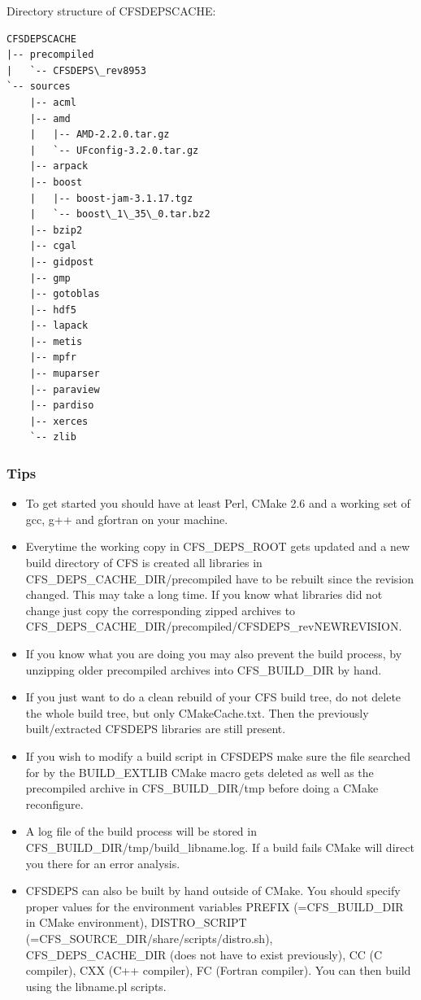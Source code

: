 Directory structure of CFSDEPSCACHE:

\begin{verbatim}
CFSDEPSCACHE
|-- precompiled
|   `-- CFSDEPS\_rev8953
`-- sources
    |-- acml
    |-- amd
    |   |-- AMD-2.2.0.tar.gz
    |   `-- UFconfig-3.2.0.tar.gz
    |-- arpack
    |-- boost
    |   |-- boost-jam-3.1.17.tgz
    |   `-- boost\_1\_35\_0.tar.bz2
    |-- bzip2
    |-- cgal
    |-- gidpost
    |-- gmp
    |-- gotoblas
    |-- hdf5
    |-- lapack
    |-- metis
    |-- mpfr
    |-- muparser
    |-- paraview
    |-- pardiso
    |-- xerces
    `-- zlib
\end{verbatim}


\subsubsection{Tips}
\begin{itemize}
\item To get  started you should have  at least Perl, CMake 2.6  and a working
set of gcc, g++ and gfortran on your machine.

\item Everytime  the working  copy in CFS\_DEPS\_ROOT  gets updated and  a new
build     directory    of     CFS    is     created    all     libraries    in
CFS\_DEPS\_CACHE\_DIR/precompiled  have  to  be  rebuilt  since  the  revision
changed. This may take a long time.  If you know what libraries did not change
just      copy       the      corresponding      zipped       archives      to
CFS\_DEPS\_CACHE\_DIR/precompiled/CFSDEPS\_revNEWREVISION.

\item If you know  what you are doing you may also  prevent the build process,
by unzipping older precompiled archives into CFS\_BUILD\_DIR by hand.

\item If you  just want to do a  clean rebuild of your CFS build  tree, do not
delete  the whole  build tree,  but only  CMakeCache.txt. Then  the previously
built/extracted CFSDEPS libraries are still present.

\item If  you wish  to modify  a build script  in CFSDEPS  make sure  the file
searched for  by the  BUILD\_EXTLIB CMake  macro gets deleted  as well  as the
precompiled archive in CFS\_BUILD\_DIR/tmp before doing a CMake reconfigure.

\item   A   log   file   of    the   build   process   will   be   stored   in
CFS\_BUILD\_DIR/tmp/build\_libname.log. If a build fails CMake will direct you
there for an error analysis.

\item CFSDEPS can  also be built by hand outside of  CMake. You should specify
proper values for the  environment variables PREFIX (=CFS\_BUILD\_DIR in CMake
environment),    DISTRO\_SCRIPT   (=CFS\_SOURCE\_DIR/share/scripts/distro.sh),
CFS\_DEPS\_CACHE\_DIR (does  not have to  exist previously), CC  (C compiler),
CXX  (C++ compiler),  FC  (Fortran compiler).  You  can then  build using  the
libname.pl scripts.
\end{itemize}



